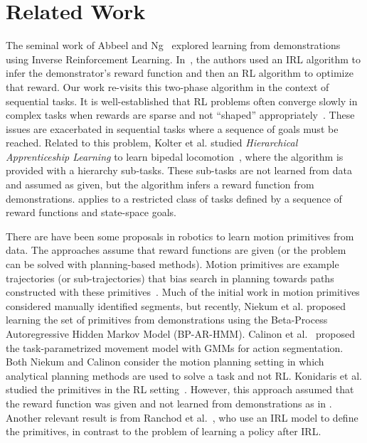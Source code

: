 %
\section{Related Work}
The seminal work of Abbeel and Ng~\cite{abbeel2004apprenticeship} explored learning from demonstrations using Inverse Reinforcement Learning.
In~\cite{abbeel2004apprenticeship}, the authors used an IRL algorithm to infer the demonstrator's reward function and then an RL algorithm to optimize that reward.
Our work re-visits this two-phase algorithm in the context of sequential tasks.
It is well-established that RL problems often converge slowly in complex tasks when rewards are sparse and not ``shaped'' appropriately~\cite{DBLP:conf/icml/NgHR99, DBLP:conf/aaai/JudahFTG14}.
These issues are exacerbated in sequential tasks where a sequence of goals must be reached.
Related to this problem, Kolter et al. studied  \emph{Hierarchical Apprenticeship Learning} to learn bipedal locomotion~\cite{DBLP:conf/nips/KolterAN07}, where the algorithm is provided with a hierarchy sub-tasks.
These sub-tasks are not learned from data and assumed as given, but the algorithm infers a reward function from demonstrations.
\hirl applies to a restricted class of tasks defined by a sequence of reward functions and state-space goals.

There are have been some proposals in robotics to learn motion primitives from data. The approaches assume that reward functions are given (or the problem can be solved with planning-based methods).
Motion primitives are example trajectories (or sub-trajectories) that bias search in planning towards paths constructed with these primitives~\cite{ijspreet2002learning,pastor2009learning,manschitz2015learning}.
Much of the initial work in motion primitives considered manually identified segments, but recently, Niekum et al. \cite{niekum2012learning} proposed learning the set of primitives from demonstrations using the Beta-Process Autoregressive Hidden Markov Model (BP-AR-HMM).
Calinon et al.~\cite{calinon2014skills} proposed the task-parametrized movement model with GMMs for action segmentation.
Both Niekum and Calinon consider the motion planning setting in which analytical planning methods are used to solve a task and not RL.
Konidaris et al. studied the primitives in the RL setting~\cite{konidaris2011robot}. 
However, this approach assumed that the reward function was given and not learned from demonstrations as in \hirl.
Another relevant result is from Ranchod et al.~\cite{ranchod2015nonparametric}, who use an IRL model to define the primitives, in contrast to the problem of learning a policy after IRL.
